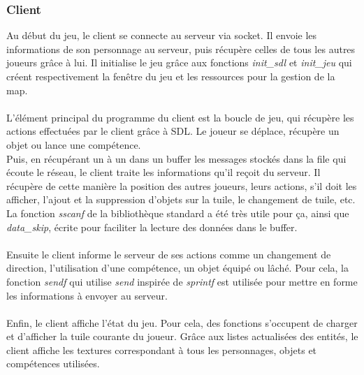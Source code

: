 \documentclass[11pt]{article}
\begin{document}
            \subsubsection{Client}
            Au début du jeu, le client se connecte au serveur via socket. Il envoie les informations de son personnage au serveur, puis récupère celles de tous les autres joueurs grâce à lui. Il initialise le jeu grâce aux fonctions \textit{init\_sdl} et \textit{init\_jeu} qui créent respectivement la fenêtre du jeu et les ressources pour la gestion de la map.\\\\
            L’élément principal du programme du client est la boucle de jeu, qui récupère les actions effectuées par le client grâce à SDL. Le joueur se déplace, récupère un objet ou lance une compétence.\\
            Puis, en récupérant un à un dans un buffer les messages stockés dans la file qui écoute le réseau, le client traite les informations qu’il reçoit du serveur. 
            Il récupère de cette manière la position des autres joueurs, leurs actions, s’il doit les afficher, l’ajout et la suppression d’objets sur la tuile, le changement de tuile, etc.
            La fonction \textit{sscanf} de la bibliothèque standard a été très utile pour ça, ainsi que \textit{data\_skip}, écrite pour faciliter la lecture des données dans le buffer.\\\\
            Ensuite le client informe le serveur de ses actions comme un changement de direction, l’utilisation d’une compétence, un objet équipé ou lâché.
            Pour cela, la fonction \textit{sendf} qui utilise \textit{send} inspirée de \textit{sprintf} est utilisée pour mettre en forme les informations à envoyer au serveur.\\\\
            Enfin, le client affiche l’état du jeu. Pour cela, des fonctions s’occupent de charger et d’afficher la tuile courante du joueur. Grâce aux listes actualisées des entités, le client affiche les textures correspondant à tous les personnages, objets et compétences utilisées.
\end{document}
